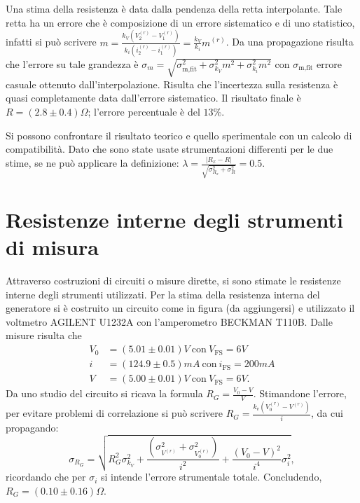 \documentclass[11pt,a4paper]{article} %
\begin{document}
{Una stima della resistenza \`e data dalla pendenza della retta interpolante. Tale retta ha un errore che \`e composizione di un errore sistematico e di uno statistico, infatti si pu\`o scrivere $m=\frac{k_V (V_2^{(r)}-V_1^{(r)})}{k_i (i_2^{(r)} - i_1^{(r)})}=\frac{k_V}{k_i}m^{(r)}$.
Da una propagazione risulta che l'errore su tale grandezza \`e $\sigma_m=\sqrt{\sigma_{\textrm{m,fit}}^2 + \sigma_{k_V}^2 m^2 + \sigma_{k_i}^2 m^2}$ con $\sigma_{\textrm{m,fit}}$ errore casuale ottenuto dall'interpolazione.
Risulta che l'incertezza sulla resistenza \`e quasi completamente data dall'errore sistematico. Il risultato finale \`e $R=(2.8 \pm 0.4) \Omega$; l'errore percentuale \`e del $13 \%$.

Si possono confrontare il risultato teorico e quello sperimentale con un calcolo di compatibilit\`a. Dato che sono state usate strumentazioni differenti per le due stime, se ne pu\`o applicare la definizione: 
$\lambda=\frac{|R_x - R|}{\sqrt{\sigma_{R_x}^2+\sigma_R^2}}=0.5$.
 











\section{Resistenze interne degli strumenti di misura}
Attraverso costruzioni di circuiti o misure dirette, si sono stimate le resistenze interne degli strumenti utilizzati.
Per la stima della resistenza interna del generatore si \`e costruito un circuito come in figura (da aggiungersi) e utilizzato il voltmetro AGILENT U1232A con l'amperometro BECKMAN T110B.
Dalle misure risulta che
\begin{align}
V_0 &=(5.01 \pm 0.01 )V \ \textrm{con}\  V_{\textrm{FS}}=6V \\
i   &=(124.9 \pm 0.5) mA \ \textrm{con}\  i_{\textrm{FS}}=200mA \\
V   &=(5.00 \pm 0.01) V \ \textrm{con}\  V_{\textrm{FS}}=6V.
\end{align}
Da uno studio del circuito si ricava la formula $R_G=\frac{V_0-V}{V}$.
Stimandone l'errore, per evitare problemi di correlazione si pu\`o scrivere $R_G=\frac{k_v (V_0^{(r)}- V^{(r)})}{i}$, da cui propagando: 
\[\sigma_{R_G}=\sqrt{R_G^2 \sigma_{k_V}^2 + \frac{(\sigma_{V^{(r)}}^2 + \sigma_{V_0^{(r)}}^2)}{i^2} + \frac{(V_0-V)^2}{i^4} \sigma_i^2},\] ricordando che per $\sigma_i$ si intende l'errore strumentale totale. Concludendo, $R_G= (0.10 \pm 0.16) \Omega$.

}
\end{document}
